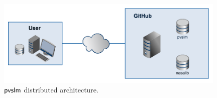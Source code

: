 \begin{figure}
  \centering \includegraphics[width=11cm]{images/arch.png}
  \caption{$\textsf{pvslm}$ distributed architecture.}
  \label{fig.arch}
\end{figure}
